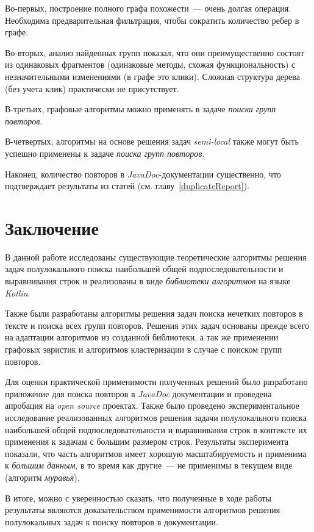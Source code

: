 Во-первых, построение полного графа похожести~--- очень долгая операция.
Необходима предварительная фильтрация, чтобы сократить количество ребер в графе. 

Во-вторых, анализ найденных  групп показал, что они преимущественно состоят из одинаковых фрагментов (одинаковые методы, схожая функциональность) с незначительными изменениями (в графе это клики).
Сложная структура дерева (без учета клик) практически не присутствует.

В-третьих, графовые алгоритмы можно применять в задаче \emph{поиска групп повторов}.

В-четвертых, алгоритмы на основе решения задач \emph{semi-local} также могут быть успешно применены к задаче \emph{поиска групп повторов}.

Наконец, количество повторов в \emph{JavaDoc}-документации существенно, что подтверждает результаты из статей (см. главу~\ref{duplicateReport}).

\section*{Заключение}

В данной работе  исследованы существующие теоретические алгоритмы решения задач полулокального поиска наибольшей общей подпоследовательности и  выравнивания строк и реализованы в виде \emph{библиотеки алгоритмов} на языке \emph{Kotlin}.

Также были разработаны алгоритмы решения задач поиска нечетких повторов в тексте и поиска всех групп повторов.
Решения  этих задач основаны прежде всего на адаптации алгоритмов из созданной библиотеки, а так же применении  графовых эвристик и алгоритмов кластеризации в случае с поиском групп повторов. 

Для оценки практической применимости полученных решений было разработано приложение для поиска повторов  в \emph{JavaDoc} документации и проведена апробация на \emph{open source} проектах. Также было проведено экспериментальное исследование реализованных алгоритмов
решения задачи полулокального поиска наибольшей общей подпоследовательности и  выравнивания строк в контексте их применения к задачам с большим размером строк.
Результаты эксперимента показали, что часть алгоритмов имеет хорошую масштабируемость и применима к \emph{большим данным}, в то время как другие~--- не применимы в текущем виде (алгоритм \emph{муравья}). 

В итоге, можно с уверенностью сказать, что полученные в ходе работы результаты являются доказательством применимости алгоритмов решения полулокальных задач к поиску повторов в документации.





